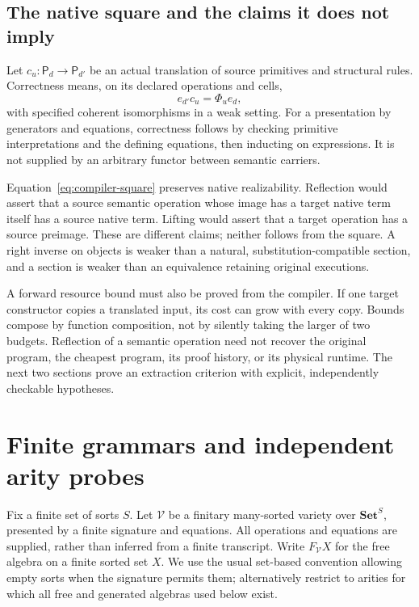 \documentclass[11pt]{article}
\theoremstyle{definition}
\theoremstyle{remark}
\newcommand{\Set}{\mathbf{Set}}
\begin{document}
\subsection{The native square and the claims it does not imply}
Let $c_u:\mathsf P_d\to\mathsf P_{d'}$ be an actual translation of
source primitives and structural rules. Correctness means, on its declared
operations and cells,
\begin{equation}\label{eq:compiler-square}
 e_{d'}c_u=\Phi_u e_d,
\end{equation}
with specified coherent isomorphisms in a weak setting. For a presentation by
generators and equations, correctness follows by checking primitive
interpretations and the defining equations, then inducting on expressions.
It is not supplied by an arbitrary functor between semantic carriers.

Equation~\eqref{eq:compiler-square} preserves native realizability.
Reflection would assert that a source semantic operation whose image has a
target native term itself has a source native term. Lifting would assert
that a target operation has a source preimage. These are different claims;
neither follows from the square. A right inverse on objects is weaker than
a natural, substitution-compatible section, and a section is weaker than
an equivalence retaining original executions.

A forward resource bound must also be proved from the compiler. If one
target constructor copies a translated input, its cost can grow with every
copy. Bounds compose by function composition, not by silently taking the
larger of two budgets. Reflection of a semantic operation need not recover
the original program, the cheapest program, its proof history, or its
physical runtime. The next two sections prove an extraction criterion with
explicit, independently checkable hypotheses.

\section{Finite grammars and independent arity probes}\label{alg-sec:finite-probes}
Fix a finite set of sorts $S$. Let $\mathcal V$ be a finitary many-sorted
variety over $\Set^S$, presented by a finite signature and equations.
All operations and equations are supplied, rather than inferred from a
finite transcript. Write $F_{\mathcal V}X$ for the free algebra on a finite
sorted set $X$. We use the usual set-based convention allowing empty sorts
when the signature permits them; alternatively restrict to arities for
which all free and generated algebras used below exist.
\end{document}
